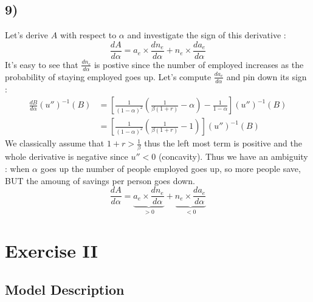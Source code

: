\documentclass{article}
\begin{document}
\subsection*{9)}
Let's derive $A$ with respect to $\alpha$ and investigate the sign of this derivative : 
$$\frac{dA}{d\alpha}=a_e\times  \frac{dn_e}{d\alpha } + n_e \times \frac{da_e}{d\alpha }$$
It's easy to see that $\frac{dn_e}{d\alpha }$ is postive since the number of employed increases as the probability of staying employed goes up. Let's compute $\frac{da_e}{d\alpha }$ and pin down its sign : 
$$\begin{aligned}
    \frac{dB}{d\alpha }(u'')^{-1}(B) &= [\frac{1}{(1-\alpha)^2}(\frac{1}{\beta (1+r)}-\alpha)-\frac{1}{1-\alpha}](u'')^{-1}(B)\\
    &= [\frac{1}{(1-\alpha)^2}(\frac{1}{\beta(1+r)}-1)](u'')^{-1}(B)
\end{aligned}$$
We classically assume that $1+r >\frac{1}{\beta}$ thus the left most term is positive and the whole derivative is negative since $u''<0$ (concavity). 
Thus we have an ambiguity : when $\alpha $ goes up the number of people employed goes up, so more people save, BUT the amoung of savings per person goes down. 
$$\frac{dA}{d\alpha}=\underbrace{a_e\times  \frac{dn_e}{d\alpha }}_{>0} + \underbrace{n_e \times \frac{da_e}{d\alpha }}_{<0}$$



\section{Exercise II}

\subsection{Model Description}
\end{document}
